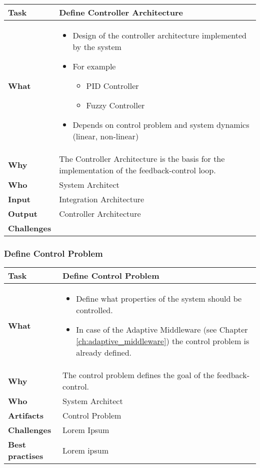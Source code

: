 \begin{minipage}{\textwidth}
 \label{table:ch6_Task_Define_Controller_Architecture}
\begin{tabular}
	{|m{3cm}|m{10cm}|} \hline \bfseries Task & Define Controller Architecture\\
	\hline \bfseries What & 
	\begin{itemize}
		\item Design of the controller architecture implemented by the system
		\item For example
		\begin{itemize}
			\item PID Controller
			\item Fuzzy Controller
		\end{itemize}
		\item Depends on control problem and system dynamics (linear, non-linear)
	\end{itemize}
	\\
	\hline \bfseries Why & The Controller Architecture is the basis for the implementation of the feedback-control loop.\\
	\hline \bfseries Who & System Architect\\
	\hline \bfseries Input & Integration Architecture\\
	\hline \bfseries Output & Controller Architecture\\
	\hline \bfseries Challenges & \\
	\hline 
\end{tabular}
\end{minipage}

\subsubsection{Define Control Problem}
\begin{minipage}{\textwidth}
 \label{table:ch6_Task_Define_Control_Problem}
\begin{tabular}
	{|m{3cm}|m{10cm}|} \hline \bfseries Task & Define Control Problem\\
	\hline \bfseries What & 
	\begin{itemize}
		\item Define what properties of the system should be controlled.
		\item In case of the Adaptive Middleware (see Chapter \ref{ch:adaptive_middleware}) the control problem is already defined.
	\end{itemize}
	\\
	\hline \bfseries Why & The control problem defines the goal of the feedback-control.\\
	\hline \bfseries Who & System Architect\\
	\hline \bfseries Artifacts & Control Problem\\
	\hline \bfseries Challenges & Lorem Ipsum\\
	\hline \bfseries Best practises & Lorem ipsum\\
	\hline 
\end{tabular}
\end{minipage}

